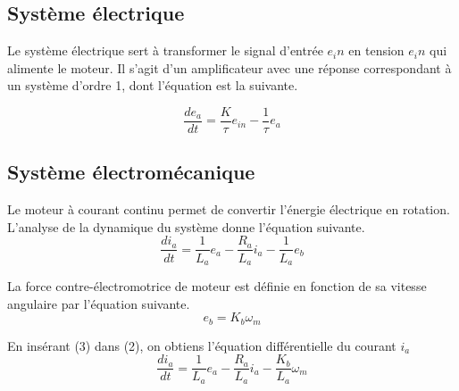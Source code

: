 \documentclass{udes_rapport} %
\begin{document}
\subsection{Système électrique}
Le système électrique sert à transformer le signal d'entrée $e_in$ en tension $e_in$ qui alimente le moteur.
Il s'agit d'un amplificateur avec une réponse correspondant à un système d'ordre 1, dont l'équation est la suivante.

\begin{equation}
\frac{de_a}{dt} = \frac{K}{\tau}e_{in} - \frac{1}{\tau}e_a
\end{equation}

\subsection{Système électromécanique}
Le moteur à courant continu permet de convertir l'énergie électrique en rotation. 
L'analyse de la dynamique du système donne l'équation suivante.
\begin{equation}
\frac{di_a}{dt} = \frac{1}{L_a}e_a-\frac{R_a}{L_a}i_a - \frac{1}{L_a}e_b
\end{equation}

La force contre-électromotrice de moteur est définie en fonction de sa vitesse angulaire par l'équation suivante.
\begin{equation}
e_b = K_b\omega_m
\end{equation}

En insérant (3) dans (2), on obtiens l'équation différentielle du courant $i_a$
\begin{equation}
\frac{di_a}{dt} = \frac{1}{L_a}e_a-\frac{R_a}{L_a}i_a - \frac{K_b}{L_a}\omega_m
\end{equation}
\end{document}
